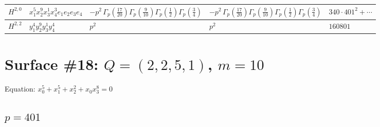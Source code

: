 \documentclass[11pt]{article}
\begin{document}
\begin{table}[ht]
{\begin{tabular}{@{}lllll@{}}
\midrule
$H^{2,0}$ & $x_{1}^{5} x_{2}^{9} x_{3}^{1} x_{4}^{3}  e_{1} e_{2} e_{3} e_{4}$ & $- p^{2} \, \Gamma_p \left( \frac{17}{20} \right) \Gamma_p \left( \frac{9}{10} \right) \Gamma_p \left( \frac{1}{2} \right) \Gamma_p \left( \frac{3}{4} \right)$ & $- p^{2} \, \Gamma_p \left( \frac{17}{20} \right) \Gamma_p \left( \frac{9}{10} \right) \Gamma_p \left( \frac{1}{2} \right) \Gamma_p \left( \frac{3}{4} \right)$ & $340{\cdot}401^{2}{+}\cdots$ \\
\midrule
$H^{2,2}$ & $y_{1}^{4} y_{2}^{9} y_{3}^{1} y_{4}^{4}$ & $p^{2} \,$ & $p^{2} \,$ & $160801$ \\
\bottomrule
\end{tabular}
}
\renewcommand{\arraystretch}{1.0}
\end{table}

\newpage

\section*{Surface \#18: $Q=(2, 2, 5, 1)$, $m=10$}

Equation: $x_0^{5} + x_1^{5} + x_2^{2} + x_0 x_3^{8} = 0$

\subsection*{$p = 401$}
\end{document}

